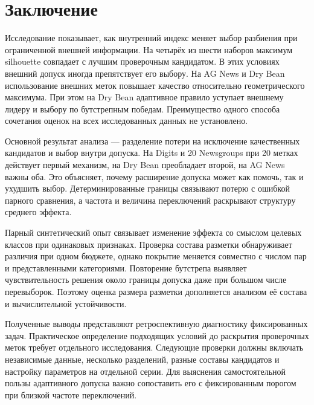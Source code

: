 \clearpage
\section{Заключение}
Исследование показывает, как внутренний индекс меняет выбор разбиения при ограниченной внешней информации. На четырёх из шести наборов максимум silhouette совпадает с лучшим проверочным кандидатом. В этих условиях внешний допуск иногда препятствует его выбору. На AG News и Dry Bean использование внешних меток повышает качество относительно геометрического максимума. При этом на Dry Bean адаптивное правило уступает внешнему лидеру и выбору по бутстрепным победам. Преимущество одного способа сочетания оценок на всех исследованных данных не установлено.

Основной результат анализа --- разделение потери на исключение качественных кандидатов и выбор внутри допуска. На Digits и 20 Newsgroups при 20 метках действует первый механизм, на Dry Bean преобладает второй, на AG News важны оба. Это объясняет, почему расширение допуска может как помочь, так и ухудшить выбор. Детерминированные границы связывают потерю с ошибкой парного сравнения, а частота и величина переключений раскрывают структуру среднего эффекта.

Парный синтетический опыт связывает изменение эффекта со смыслом целевых классов при одинаковых признаках. Проверка состава разметки обнаруживает различия при одном бюджете, однако покрытие меняется совместно с числом пар и представленными категориями. Повторение бутстрепа выявляет чувствительность решения около границы допуска даже при большом числе перевыборок. Поэтому оценка размера разметки дополняется анализом её состава и вычислительной устойчивости.

Полученные выводы представляют ретроспективную диагностику фиксированных задач. Практическое определение подходящих условий до раскрытия проверочных меток требует отдельного исследования. Следующие проверки должны включать независимые данные, несколько разделений, разные составы кандидатов и настройку параметров на отдельной серии. Для выяснения самостоятельной пользы адаптивного допуска важно сопоставить его с фиксированным порогом при близкой частоте переключений.
